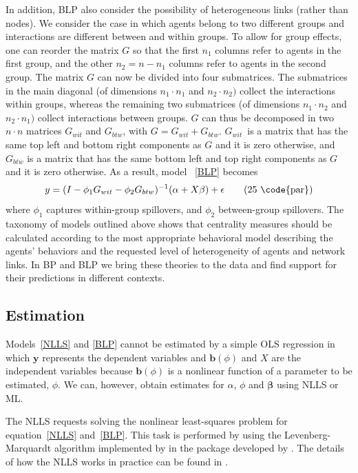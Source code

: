 \documentclass[nojss]{jss}
\begin{document}
In addition, BLP also consider the possibility of heterogeneous links (rather than nodes). We consider the case in which agents belong to two different groups and interactions are different between and within groups. To allow for group effects, one can reorder the matrix $G$ so that the first $n_{1}$ columns refer to agents in the first group, and the other $n_{2}=n-n_{1}$ columns refer to agents in the second group. The matrix $G$ can now be divided into four submatrices. The submatrices in the main diagonal (of dimensions $n_{1}\cdot n_{1}$ and $n_{2}\cdot n_{2})$ collect the interactions within groups, whereas the remaining two submatrices (of dimensions $n_{1}\cdot n_{2}$ and $n_{2}\cdot n_{1})$ collect interactions
between groups. $G$ can thus be decomposed in two $n\cdot n$ matrices $G_{wit}$ and $G_{btw}$, with $G=G_{wit}+G_{btw}$. $G_{wit}$\ is a matrix that has the same top left and bottom right components as $G$ and it is zero otherwise, and $G_{btw}$ is a matrix that has the same bottom left and top right components as $G$ and it is zero otherwise. As a result, model ~\ref{BLP} becomes
\begin{equation}
y=(I-\phi _{1}G_{wit}-\phi _{2}G_{btw})^{-1}(\alpha +X\mathbf{\beta })+ \mathbf{\epsilon } \tag{25 \code{par}}  \label{BLP_4}
\end{equation}\setcounter{equation}{25}\noindent 
where $\phi _{1}$ captures within-group spillovers, and $\phi _{2}$ between-group spillovers.
The taxonomy of models outlined above shows that centrality measures should be calculated according to the most appropriate behavioral model describing the agents' behaviors and the requested level of heterogeneity of agents and network links. In BP and BLP we bring these theories to the data and find support for their predictions in different contexts.

\subsection{Estimation} \label{sec:estimation}

Models~\ref{NLLS} and \ref{BLP} cannot be estimated by a simple OLS regression in which $\mathbf{y}$ represents the dependent variables and $\mathbf{b}(\phi)$ and $X$ are the independent variables because $\mathbf{b}(\phi)$ is a nonlinear function of a parameter to be estimated, $\phi $. We can, however, obtain estimates for $\alpha $, $\phi$ and $\mathbf{\beta}$ using NLLS or ML.

The NLLS requests solving the nonlinear least-squares problem for equation~\ref{NLLS} and~\ref{BLP}. This task is performed by  using the Levenberg-Marquardt algorithm implemented by \cite{Box:1969} in the  package  developed by \cite{minpack.lm}. The details of how the NLLS works in practice can be found in \cite{More:1978}.
\end{document}
